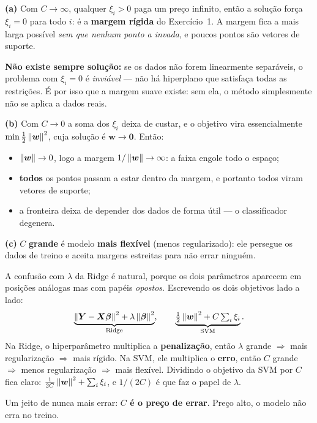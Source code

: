 \documentclass[11pt,a4paper]{article}
\begin{document}
\begin{solucao}
\textbf{(a)} Com $C\to\infty$, qualquer $\xi_i>0$ paga um preço infinito, então a
solução força $\xi_i=0$ para todo $i$: é a \textbf{margem rígida} do
Exercício~1. A margem fica a mais larga possível \emph{sem que nenhum ponto a
invada}, e poucos pontos são vetores de suporte.

\textbf{Não existe sempre solução:} se os dados não forem linearmente separáveis,
o problema com $\xi_i=0$ é \emph{inviável} --- não há hiperplano que satisfaça
todas as restrições. É por isso que a margem suave existe: sem ela, o método
simplesmente não se aplica a dados reais.

\smallskip
\textbf{(b)} Com $C\to 0$ a soma dos $\xi_i$ deixa de custar, e o objetivo vira
essencialmente $\min\tfrac12\left\lVert \bm w \right\rVert^2$, cuja solução é $\bm w\to\bm 0$.
Então:
\begin{itemize}[leftmargin=1.4cm]
  \item $\left\lVert \bm w \right\rVert\to 0$, logo a margem $1/\left\lVert \bm w \right\rVert\to\infty$: a faixa
        engole todo o espaço;
  \item \textbf{todos} os pontos passam a estar dentro da margem, e portanto
        todos viram vetores de suporte;
  \item a fronteira deixa de depender dos dados de forma útil --- o classificador
        degenera.
\end{itemize}

\smallskip
\textbf{(c)} $C$ \textbf{grande} é modelo \textbf{mais flexível} (menos
regularizado): ele persegue os dados de treino e aceita margens estreitas para
não errar ninguém.

A confusão com $\lambda$ da Ridge é natural, porque os dois parâmetros aparecem
em posições análogas mas com papéis \emph{opostos}. Escrevendo os dois objetivos
lado a lado:
\[
  \underbrace{\left\lVert \bm Y-\bm X\bm{\beta} \right\rVert^2 + \lambda\left\lVert \bm{\beta} \right\rVert^2}_{\text{Ridge}},
  \qquad
  \underbrace{\tfrac12\left\lVert \bm w \right\rVert^2 + C\textstyle\sum_i\xi_i}_{\text{SVM}} .
\]
Na Ridge, o hiperparâmetro multiplica a \textbf{penalização}, então
$\lambda$ grande $\Rightarrow$ mais regularização $\Rightarrow$ mais rígido. Na
SVM, ele multiplica o \textbf{erro}, então $C$ grande $\Rightarrow$ menos
regularização $\Rightarrow$ mais flexível. Dividindo o objetivo da SVM por $C$
fica claro: $\tfrac{1}{2C}\left\lVert \bm w \right\rVert^2 + \sum_i\xi_i$, e $1/(2C)$ é que faz o
papel de $\lambda$.

Um jeito de nunca mais errar: \textbf{$C$ é o preço de errar}. Preço alto, o
modelo não erra no treino.


\end{solucao}
\end{document}
